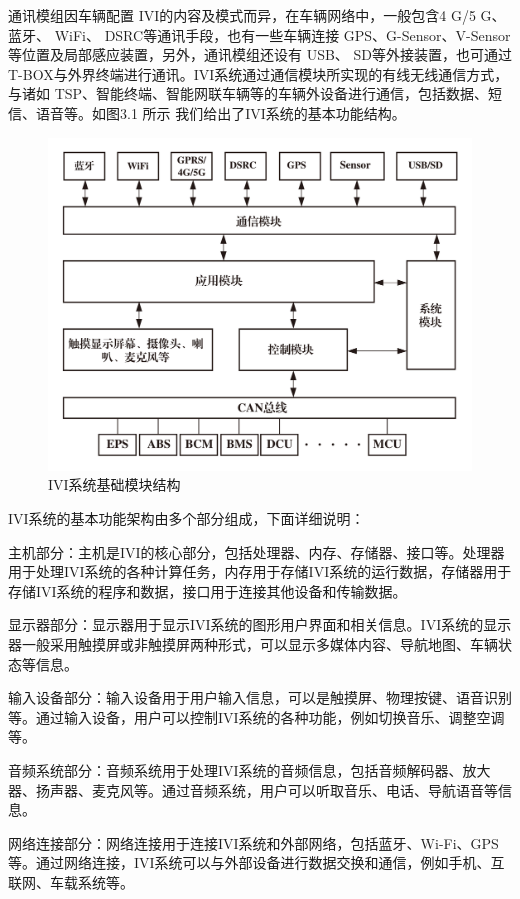 通讯模组因车辆配置 IVI的内容及模式而异，在车辆网络中，一般包含4 G/5 G、蓝牙、 WiFi、 DSRC等通讯手段，也有一些车辆连接 GPS、G-Sensor、V-Sensor等位置及局部感应装置，另外，通讯模组还设有 USB、 SD等外接装置，也可通过T-BOX与外界终端进行通讯。IVI系统通过通信模块所实现的有线无线通信方式，与诸如 TSP、智能终端、智能网联车辆等的车辆外设备进行通信，包括数据、短信、语音等。如图3.1 所示 我们给出了IVI系统的基本功能结构。
\begin{figure}
  \centering
  \includegraphics[scale=0.4]{resources/img/a50.jpg}
  \caption{IVI系统基础模块结构}
\end{figure}
IVI系统的基本功能架构由多个部分组成，下面详细说明：

主机部分：主机是IVI的核心部分，包括处理器、内存、存储器、接口等。处理器用于处理IVI系统的各种计算任务，内存用于存储IVI系统的运行数据，存储器用于存储IVI系统的程序和数据，接口用于连接其他设备和传输数据。

显示器部分：显示器用于显示IVI系统的图形用户界面和相关信息。IVI系统的显示器一般采用触摸屏或非触摸屏两种形式，可以显示多媒体内容、导航地图、车辆状态等信息。

输入设备部分：输入设备用于用户输入信息，可以是触摸屏、物理按键、语音识别等。通过输入设备，用户可以控制IVI系统的各种功能，例如切换音乐、调整空调等。

音频系统部分：音频系统用于处理IVI系统的音频信息，包括音频解码器、放大器、扬声器、麦克风等。通过音频系统，用户可以听取音乐、电话、导航语音等信息。

网络连接部分：网络连接用于连接IVI系统和外部网络，包括蓝牙、Wi-Fi、GPS等。通过网络连接，IVI系统可以与外部设备进行数据交换和通信，例如手机、互联网、车载系统等。

